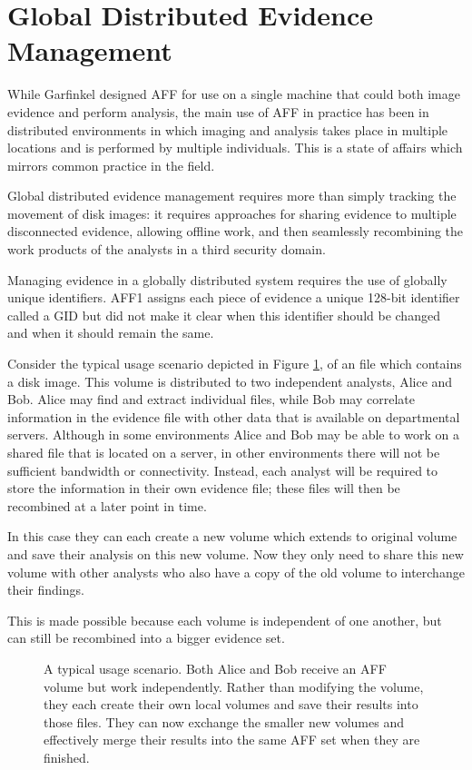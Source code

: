 \documentclass[10pt, conference]{IEEEtran}
\begin{document}
\section{Global Distributed Evidence Management}
While Garfinkel designed AFF for use on a single machine that could
both image evidence and perform analysis, the main use of AFF in
practice has been in distributed environments in which imaging and
analysis takes place in multiple locations and is performed by
multiple individuals. This is a state of affairs which mirrors common
practice in the field. 

Global distributed evidence management requires
more than simply tracking the movement of disk images: it requires
approaches for sharing evidence to multiple disconnected
evidence, allowing offline work, and then seamlessly recombining the
work products of the analysts in a third security domain.

Managing evidence in a globally distributed system requires the use of
globally unique identifiers. AFF1 assigns
each piece of evidence a unique 128-bit identifier called a GID but did
not make it clear when this identifier should be changed and when it
should remain the same. 

Consider the typical usage scenario depicted in Figure \ref{usage}, of
an file which contains a disk image. This volume is distributed to two
independent analysts, Alice and Bob. Alice may find and extract
individual files, while Bob may correlate information in the evidence
file with other data that is available on departmental
servers. Although in some environments Alice and Bob may be able to
work on a shared file that is located on a server, in other
environments there will not be sufficient bandwidth or
connectivity. Instead, each analyst will be required to store the
information in their own evidence file; these files will then be
recombined at a later point in time.

In this case they can each create a new volume which extends to
original volume and save their analysis on this new volume. Now they
only need to share this new volume with other analysts who also have a
copy of the old volume to interchange their findings.

This is made possible because each volume is independent of one
another, but can still be recombined into a bigger evidence set. 

\begin{figure}[tb]
  \begin{center}
  \mbox{\columnwidth {}}
  \caption{A typical usage scenario. Both Alice and Bob receive an AFF
  volume but work independently. Rather than modifying the volume,
  they each create their own local volumes and save their results into
  those files. They can now exchange the smaller new volumes and
  effectively merge their results into the same AFF set when they are finished.}
  \label{usage}
  \end{center}
\end{figure}
\end{document}

